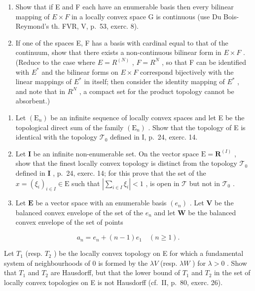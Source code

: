 \begin{enumerate}
\def\labelenumi{\alph{enumi})}
\item
  Show that if E and F each have an enumerable basis then every bilinear mapping of \(E \times F\) in a locally convex space G is continuous (use Du Bois-Reymond's th. FVR, V, p.~53, exerc. 8).
\item
  If one of the spaces E, F has a basis with cardinal equal to that of the continuum, show that there exists a non-continuous bilinear form in \(E \times F\) . (Reduce to the case where \(E = R^{(N)}\) , \(F = R^{N}\) , so that F can be identified with \(E^{*}\) and the bilinear forms on \(E \times F\) correspond bijectively with the linear mappings of \(E^{*}\) in itself; then consider the identity mapping of \(E^{*}\) , and note that in \(R^{N}\) , a compact set for the product topology cannot be absorbent.)
\end{enumerate}

\begin{enumerate}
\def\labelenumi{\arabic{enumi})}
\setcounter{enumi}{9}
\item
  Let \((\mathrm{E}_n)\) be an infinite sequence of locally convex spaces and let E be the topological direct sum of the family \((\mathrm{E}_n)\) . Show that the topology of E is identical with the topology \(\mathcal{T}_0\) defined in I, p.~24, exerc. 14.
\item
  Let \(\mathbf{I}\) be an infinite non-enumerable set. On the vector space \(\mathrm{E} = \mathbf{R}^{(I)}\) , show that the finest locally convex topology is distinct from the topology \(\mathcal{T}_0\) defined in \(\mathbf{I}\) , p.~24, exerc. 14; for this prove that the set of the \(x = (\xi_{i})_{i\in I} \in \mathrm{E}\) such that \(|\sum_{i\in I} \xi_i| < 1\) , is open in \(\mathcal{T}\) but not in \(\mathcal{T}_0\) .
\item
  Let \(\mathbf{E}\) be a vector space with an enumerable basis \((e_n)\) . Let \(\mathbf{V}\) be the balanced convex envelope of the set of the \(e_n\) and let \(\mathbf{W}\) be the balanced convex envelope of the set of points
\end{enumerate}

\[
a _ {n} = e _ {n} + (n - 1) e _ {1} \quad (n \geqslant 1).
\]

Let \(T_{1}\) (resp. \(T_{2}\) ) be the locally convex topology on E for which a fundamental system of neighbourhoods of 0 is formed by the \(\lambda V\) (resp. \(\lambda W\) ) for \(\lambda > 0\) . Show that \(T_{1}\) and \(T_{2}\) are Hausdorff, but that the lower bound of \(T_{1}\) and \(T_{2}\) in the set of locally convex topologies on E is not Hausdorff (cf.~II, p.~80, exerc. 26).

